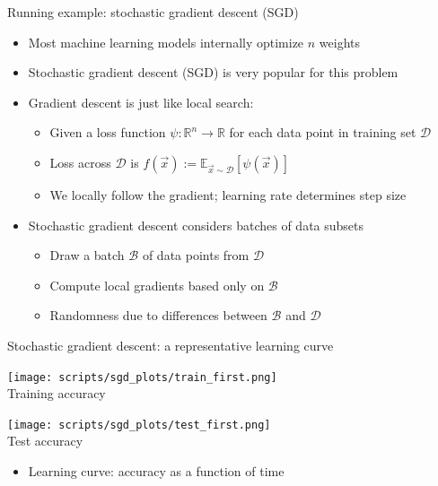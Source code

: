 \begin{frame}[c]{Running example: stochastic gradient descent (SGD)}

\begin{itemize}
  \item Most machine learning models internally optimize $n$ weights
  \medskip
  \pause
  \item Stochastic gradient descent (SGD) is very popular for this problem
  \medskip
  \pause
  \item \alert{Gradient descent} is just like local search:
  \begin{itemize}
    \item Given a loss function $\psi: \mathds{R}^n \rightarrow \mathds{R}$ for
    each data point in training set $\mathcal{D}$
    \item Loss across $\mathcal{D}$ is $f(\vec{x}) := \mathds{E}_{\vec{x} \sim
    \mathcal{D}}\left[ \psi(\vec{x}) \right]$
    \item We locally follow the gradient; \alert{learning rate} %
    determines step size
  \end{itemize}
  \medskip
  \pause
  \item \alert{Stochastic gradient descent} considers batches of data subsets
  \begin{itemize}
    \item Draw a batch $\mathcal{B}$ of data points from $\mathcal{D}$
    \item Compute local gradients based only on $\mathcal{B}$
    \item Randomness due to differences between $\mathcal{B}$ and $\mathcal{D}$
  \end{itemize}

\end{itemize}
  

\end{frame}

\begin{frame}[c]{Stochastic gradient descent: a representative learning curve}


\begin{multicols}{2}
\begin{center}
\texttt{[image: scripts/sgd\_plots/train\_first.png]}\\
Training accuracy
\end{center}
\columnbreak
\begin{center}
\texttt{[image: scripts/sgd\_plots/test\_first.png]}\\
Test accuracy
\end{center}
\end{multicols}

\begin{itemize}
  \item \alert{Learning curve}: accuracy as a function of time
\end{itemize}
  
\end{frame}

